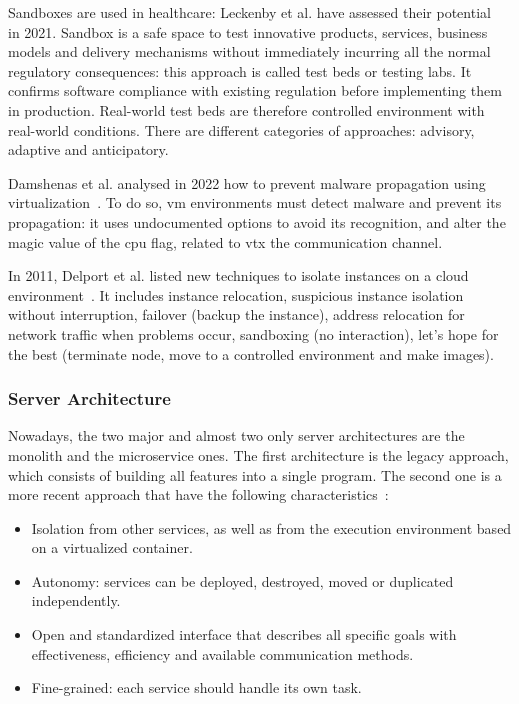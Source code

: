 Sandboxes are used in healthcare: Leckenby et al. have assessed their potential~\cite{leckenby_sandbox_2021} in 2021. Sandbox is a safe space to test innovative products, services, business models and delivery mechanisms without immediately incurring all the normal regulatory consequences: this approach is called test beds or testing labs. It confirms software compliance with existing regulation before implementing them in production. Real-world test beds are therefore controlled environment with real-world conditions. There are different categories of approaches: advisory, adaptive and anticipatory. %

Damshenas et al. analysed in 2022 how to prevent malware propagation using virtualization~\cite{damshenas_survey_2013}. To do so, \gls{vm} environments must detect malware and prevent its propagation: it uses undocumented  options to avoid its recognition, and alter the magic value of the  \gls{cpu} flag, related to \gls{vtx} the communication channel. %

In 2011, Delport et al. listed new techniques to isolate instances on a \gls{cloud} environment~\cite{delport_isolating_2011}. It includes instance relocation, suspicious instance isolation without interruption, failover (backup the instance), address relocation for network traffic when problems occur, sandboxing (no interaction), let's hope for the best (terminate node, move to a controlled environment and make images). %

\subsubsection{Server Architecture}
\label{subsubsec:state_review_results_serverarchitecture}

Nowadays, the two major and almost two only server architectures are the monolith and the \gls{microservice} ones. The first architecture is the legacy approach, which consists of building all features into a single program. The second one is a more recent approach that have the following characteristics~\cite{almeida_survey_2017}:
\begin{itemize}
    \item Isolation from other services, as well as from the execution environment based on a virtualized container.
    \item Autonomy: services can be deployed, destroyed, moved or duplicated independently. 
    \item Open and standardized interface that describes all specific goals with effectiveness, efficiency and available communication methods.
    \item Fine-grained: each service should handle its own task.
\end{itemize}

